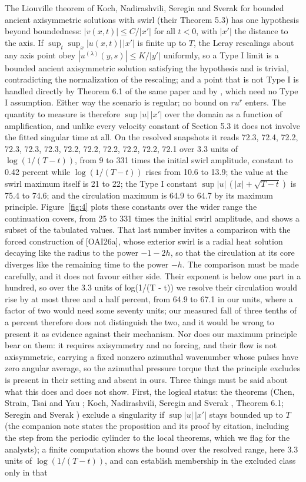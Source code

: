 \documentclass[11pt]{article}
\begin{document}
The Liouville theorem of Koch, Nadirashvili, Seregin and Sverak \cite{KNSS09} for bounded ancient axisymmetric solutions with swirl (their Theorem 5.3) has one hypothesis beyond boundedness: $|v(x, t)| \le C / |x'|$ for all $t < 0$, with $|x'|$ the distance to the axis. If $\sup_t \sup_x |u(x, t)|\,|x'|$ is finite up to $T$, the Leray rescalings about any axis point obey $|u^{(\lambda)}(y, s)| \le K / |y'|$ uniformly, so a Type I limit is a bounded ancient axisymmetric solution satisfying the hypothesis and is trivial, contradicting the normalization of the rescaling; and a point that is not Type I is handled directly by Theorem 6.1 of the same paper and by \cite{CSTY08}, which need no Type I assumption. Either way the scenario is regular; no bound on $r u^r$ enters. The quantity to measure is therefore $\sup |u|\,|x'|$ over the domain as a function of amplification, and unlike every velocity constant of Section 5.3 it does not involve the fitted singular time at all. On the resolved snapshots it reads 72.3, 72.4, 72.2, 72.3, 72.3, 72.3, 72.2, 72.2, 72.2, 72.2, 72.2, 72.1 over 3.3 units of $\log(1/(T - t))$, from 9 to 331 times the initial swirl amplitude, constant to 0.42 percent while $\log(1/(T - t))$ rises from 10.6 to 13.9; the value at the swirl maximum itself is 21 to 22; the Type I constant $\sup |u|\,(|x| + \sqrt{T - t})$ is 75.4 to 74.6; and the circulation maximum is 64.9 to 64.7 by its maximum principle. Figure~\ref{fig:4} plots these constants over the wider range the continuation covers, from 25 to 331 times the initial swirl amplitude, and shows a subset of the tabulated values. That last number invites a comparison with the forced construction of [OAI26a], whose exterior swirl is a radial heat solution decaying like the radius to the power $-1-2h$, so that the circulation at its core diverges like the remaining time to the power $-h$. The comparison must be made carefully, and it does not favour either side. Their exponent is below one part in a hundred, so over the 3.3 units of log(1/(T - t)) we resolve their circulation would rise by at most three and a half percent, from 64.9 to 67.1 in our units, where a factor of two would need some seventy units; our measured fall of three tenths of a percent therefore does not distinguish the two, and it would be wrong to present it as evidence against their mechanism. Nor does our maximum principle bear on them: it requires axisymmetry and no forcing, and their flow is not axisymmetric, carrying a fixed nonzero azimuthal wavenumber whose pulses have zero angular average, so the azimuthal pressure torque that the principle excludes is present in their setting and absent in ours. Three things must be said about what this does and does not show. First, the logical status: the theorems (Chen, Strain, Tsai and Yau \cite{CSTY08}; Koch, Nadirashvili, Seregin and Sverak \cite{KNSS09}, Theorem 6.1; Seregin and Sverak \cite{SS09}) exclude a singularity if $\sup |u|\,|x'|$ stays bounded up to $T$ (the companion note states the proposition and its proof by citation, including the step from the periodic cylinder to the local theorems, which we flag for the analysts); a finite computation shows the bound over the resolved range, here 3.3 units of $\log(1/(T - t))$, and can establish membership in the excluded class only in that 
\end{document}
